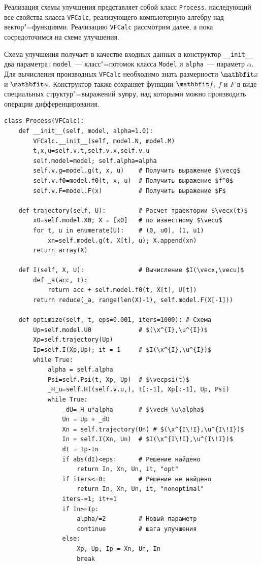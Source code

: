 \documentclass[a4paper,14pt, openany, twoside, draft]{extbook} %
\begin{document}
Реализация схемы улучшения представляет собой класс \texttt{Process}, наследующий все свойства класса \texttt{VFCalc}, реализующего компьютерную алгебру над вектор"=функциями.  Реализацию \texttt{VFCalc} рассмотрим далее, а пока сосредоточимся на схеме улучшения.

Схема улучшения получает в качестве входных данных в конструктор \texttt{\_\_init\_\_} два параметра\,: \texttt{model}~--- класс"=потомок класса \texttt{Model} и \texttt{alpha}~--- параметр $\alpha$.  Для вычисления производных \texttt{VFCalc} необходимо знать размерности $\vecx$ и $\vecu$.  Конструктор также сохраняет функции $\vecf,$ $f$ и $F$ в виде специальных структур"=выражений \texttt{sympy}, над которыми можно производить операции дифференцирования.

\begin{verbatim}
class Process(VFCalc):
    def __init__(self, model, alpha=1.0):
        VFCalc.__init__(self, model.N, model.M)
        t,x,u=self.v.t,self.v.x,self.v.u
        self.model=model; self.alpha=alpha
        self.v.g=model.g(t, x, u)    # Получить выражение $\vecg$
        self.v.f0=model.f0(t, x, u)  # Получить выражение $f^0$
        self.v.F=model.F(x)          # Получить выражение $F$

    def trajectory(self, U):         # Расчет траектории $\vecx(t)$
        x0=self.model.X0; X = [x0]   # по известному $\vecu$
        for t, u in enumerate(U):    # (0, u0), (1, u1)
            xn=self.model.g(t, X[t], u); X.append(xn)
        return array(X)

    def I(self, X, U):               # Вычисление $I(\vecx,\vecu)$
        def _a(acc, t):
            return acc + self.model.f0(t, X[t], U[t])
        return reduce(_a, range(len(X)-1), self.model.F(X[-1]))

    def optimize(self, t, eps=0.001, iters=1000): # Схема
        Up=self.model.U0             # $(\x^{I},\u^{I})$
        Xp=self.trajectory(Up)
        Ip=self.I(Xp,Up); it = 1     # $I(\x^{I},\u^{I})$
        while True:
            alpha = self.alpha
            Psi=self.Psi(t, Xp, Up)  # $\vecpsi(t)$
            _H_u=self.H((self.v.u,), t[:-1], Xp[:-1], Up, Psi)
            while True:
                _dU=_H_u*alpha       # $\vecH_\u\alpha$
                Un = Up + _dU
                Xn = self.trajectory(Un) # $(\x^{I\!I},\u^{I\!I})$
                In = self.I(Xn, Un)  # $I(\x^{I\!I},\u^{I\!I})$
                dI = Ip-In
                if abs(dI)<eps:      # Решение найдено
                    return In, Xn, Un, it, "opt"
                if iters<=0:         # Решение не найдено
                    return In, Xn, Un, it, "nonoptimal"
                iters-=1; it+=1
                if In>=Ip:
                    alpha/=2         # Новый параметр
                    continue         # шага улучшения
                else:
                    Xp, Up, Ip = Xn, Un, In
                    break
\end{verbatim}
\end{document}
